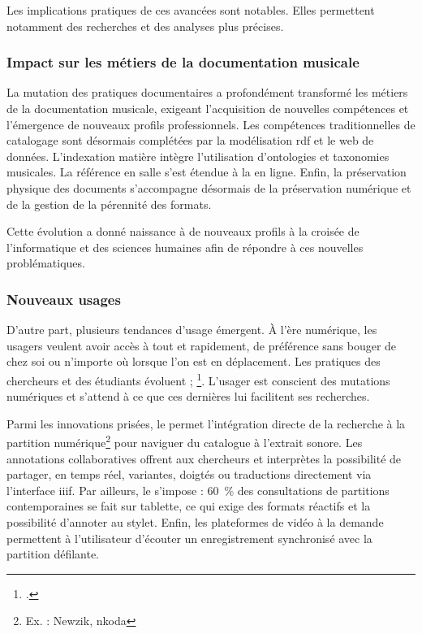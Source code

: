 Les implications pratiques de ces avancées sont notables. Elles permettent notamment des recherches et des analyses plus précises.

\subsubsection{Impact sur les métiers de la documentation musicale}

La mutation des pratiques documentaires a profondément transformé les métiers de la documentation musicale, exigeant l'acquisition de nouvelles compétences et l'émergence de nouveaux profils professionnels. Les compétences traditionnelles de catalogage sont désormais complétées par la modélisation \gls{rdf} et le web de données. L'indexation matière intègre l'utilisation d'\glspl{ontologie} et \glspl{taxonomie} musicales. La référence en salle s'est étendue à la  en ligne. Enfin, la préservation physique des documents s'accompagne désormais de la préservation numérique et de la gestion de la pérennité des formats.

Cette évolution a donné naissance à de nouveaux profils à la croisée de l'informatique et des sciences humaines afin de répondre à ces nouvelles problématiques.

\subsubsection{Nouveaux usages}

D'autre part, plusieurs tendances d'usage émergent. À l'ère numérique, les usagers veulent avoir accès à tout et rapidement, de préférence sans bouger de chez soi ou n'importe où lorsque l'on est en déplacement. Les pratiques des chercheurs et des étudiants évoluent ; \footcite{mesguichContexteEnjeux2017}. L'usager est conscient des mutations numériques et s'attend à ce que ces dernières lui facilitent ses recherches.

Parmi les innovations prisées, le  permet l'intégration directe de la recherche à la partition numérique\footnote{Ex. : Newzik, nkoda} pour naviguer du catalogue à l'extrait sonore. Les annotations collaboratives offrent aux chercheurs et interprètes la possibilité de partager, en temps réel, variantes, doigtés ou traductions directement via l'interface \gls{iiif}. Par ailleurs, le  s'impose : 60~\% des consultations de partitions contemporaines se fait sur tablette, ce qui exige des formats réactifs et la possibilité d'annoter au stylet. Enfin, les plateformes de vidéo à la demande permettent à l'utilisateur d'écouter un enregistrement synchronisé avec la partition défilante.

